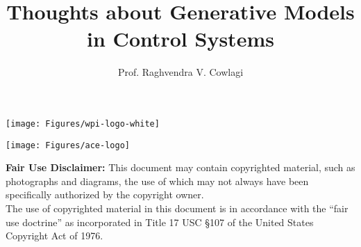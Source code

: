 \documentclass[aspectratio=169,handout]{beamer} 	%
\begin{document}
\title[] 					%
{\LARGE \bf Thoughts about Generative Models in Control Systems \\   	%
	{\small \it }} 	%
\author[Prof. R. V. Cowlagi]{{Prof. Raghvendra V. Cowlagi}\inst{}} 		%


{
	\begin{frame}[noframenumbering]
		
		\vspace{2\baselineskip}
		\begin{minipage}{0.7\columnwidth}
			\titlepage
		\end{minipage}
		\begin{minipage}{0.25\columnwidth}
			\begin{center}
				\def\logowidth{0.9\columnwidth}
				\texttt{[image: Figures/wpi-logo-white]}
				
				\vspace{2\baselineskip}
				\texttt{[image: Figures/ace-logo]}
			\end{center}
		
		\end{minipage}
		
		\vspace{\baselineskip}
		\begin{center}
		
		\parbox{0.8\columnwidth}{ \linespread{1} \Tiny\it\par \textbf{Fair Use Disclaimer:}
			This document may contain copyrighted material, such as photographs and
			diagrams, the use of which may not always have been specifically authorized
			by the copyright owner. \\ The use of copyrighted material in this document
			is in accordance with the ``fair use doctrine'' as incorporated in Title 17
			USC \S 107 of the United States Copyright Act of 1976.}
		\end{center}
		
	\end{frame}
}
\end{document}
